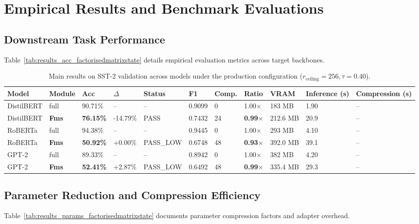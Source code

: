 \section{Empirical Results and Benchmark Evaluations}

\subsection{Downstream Task Performance}
Table~\ref{tab:results_acc_factorisedmatrixstate} details empirical evaluation metrics across target backbones.

\begin{table}[t]
\centering
\small
\begin{tabular}{lllllllllll}
\toprule
\textbf{Model} & \textbf{Module} & \textbf{Acc} & \textbf{$\Delta$} & \textbf{Status} & \textbf{F1} & \textbf{Comp.} & \textbf{Ratio} & \textbf{VRAM} & \textbf{Inference (s)} & \textbf{Compression (s)} \\
\midrule
DistilBERT & full & 90.71\% & -- & -- & 0.9099 & 0 & 1.00$\times$ & 183 MB & 1.90 & -- \\
DistilBERT & \textbf{Fms} & \textbf{76.15\%} & -14.79\% & PASS & 0.7432 & 24 & \textbf{0.99$\times$} & 212.6 MB & 20.9 & -- \\
RoBERTa & full & 94.38\% & -- & -- & 0.9445 & 0 & 1.00$\times$ & 293 MB & 4.10 & -- \\
RoBERTa & \textbf{Fms} & \textbf{50.92\%} & +0.00\% & PASS\_LOW & 0.6748 & 48 & \textbf{0.93$\times$} & 392.0 MB & 39.1 & -- \\
GPT-2 & full & 89.33\% & -- & -- & 0.8942 & 0 & 1.00$\times$ & 382 MB & 4.20 & -- \\
GPT-2 & \textbf{Fms} & \textbf{52.41\%} & +2.87\% & PASS\_LOW & 0.6492 & 48 & \textbf{0.99$\times$} & 335.4 MB & 29.3 & -- \\
\bottomrule
\end{tabular}
\caption{Main results on SST-2 validation across models under the production configuration ($r_{\mathrm{ceiling}}=256, \tau=0.40$).}
\label{tab:main_sst2}
\end{table}

\subsection{Parameter Reduction and Compression Efficiency}
Table~\ref{tab:results_params_factorisedmatrixstate} documents parameter compression factors and adapter overhead.


